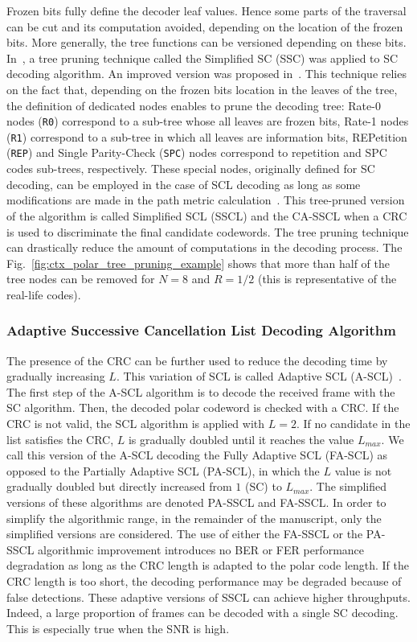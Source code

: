 Frozen bits fully define the decoder leaf values. Hence some parts of the
traversal can be cut and its computation avoided, depending on the location of
the frozen bits. More generally, the tree functions can be versioned depending
on these bits. In~\cite{Alamdar-Yazdi2011}, a tree pruning technique called the
Simplified SC (SSC) was applied to SC decoding algorithm. An improved version
was proposed in~\cite{Sarkis2014a}. This technique relies on the fact that,
depending on the frozen bits location in the leaves of the tree, the definition
of dedicated nodes enables to prune the decoding tree: Rate-0 nodes (\verb|R0|)
correspond to a sub-tree whose all leaves are frozen bits, Rate-1 nodes
(\verb|R1|) correspond to a sub-tree in which all leaves are information bits,
REPetition (\verb|REP|) and Single Parity-Check (\verb|SPC|) nodes correspond to
repetition and SPC codes sub-trees, respectively. These special nodes,
originally defined for SC decoding, can be employed in the case of SCL decoding
as long as some modifications are made in the path metric
calculation~\cite{Sarkis2016}. This tree-pruned version of the algorithm is
called Simplified SCL (SSCL) and the CA-SSCL when a CRC is used to discriminate
the final candidate codewords. The tree pruning technique can drastically reduce
the amount of computations in the decoding process. The
Fig.~\ref{fig:ctx_polar_tree_pruning_example} shows that more than half of the
tree nodes can be removed for $N = 8$ and $R = 1 / 2$ (this is representative of
the real-life codes).

\subsubsection{Adaptive Successive Cancellation List Decoding Algorithm}
\label{sec:ctx_polar_ascl}

The presence of the CRC can be further used to reduce the decoding time by
gradually increasing $L$. This variation of SCL is called Adaptive SCL
(A-SCL)~\cite{Li2012}. The first step of the A-SCL algorithm is to decode the
received frame with the SC algorithm. Then, the decoded polar codeword is
checked with a CRC. If the CRC is not valid, the SCL algorithm is applied with
$L=2$. If no candidate in the list satisfies the CRC, $L$ is gradually doubled
until it reaches the value $L_{max}$. We call this version of the A-SCL decoding
the Fully Adaptive SCL (FA-SCL) as opposed to the Partially Adaptive SCL
(PA-SCL), in which the $L$ value is not gradually doubled but directly increased
from $1$ (SC) to $L_{max}$. The simplified versions of these algorithms are
denoted PA-SSCL and FA-SSCL. In order to simplify the algorithmic range, in the
remainder of the manuscript, only the simplified versions are considered. The
use of either the FA-SSCL or the PA-SSCL algorithmic improvement introduces no
BER or FER performance degradation as long as the CRC length is adapted to the
polar code length. If the CRC length is too short, the decoding performance may
be degraded because of false detections. These adaptive versions of SSCL can
achieve higher throughputs. Indeed, a large proportion of frames can be decoded
with a single SC decoding. This is especially true when the SNR is high.


